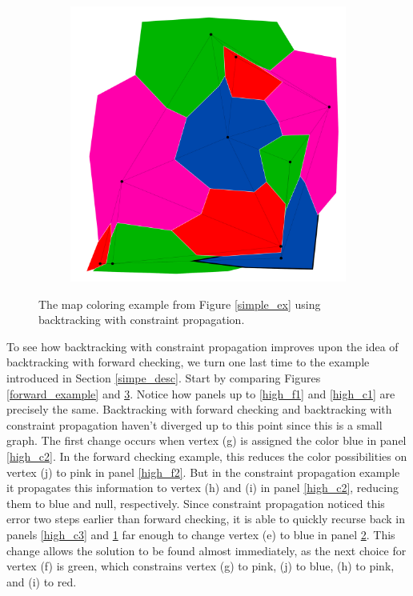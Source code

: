 \documentclass{article}
\begin{document}
\begin{figure}[h!]
\begin{subfigure}{0.18\textwidth}
				\caption{}
				\label{high_c4}
			\end{subfigure}
			\;
			\begin{subfigure}{0.18\textwidth}
				\centering
				\includegraphics[width=\textwidth]{images/sequences/mac_backtracking/bt_mac_I00018}
				\caption{}
				\label{high_c5}
			\end{subfigure}
	
			\caption{The map coloring example from Figure \ref{simple_ex} using backtracking with constraint propagation.}
			\label{mac_example}
		\end{figure}
		
		To see how backtracking with constraint propagation improves upon the idea of backtracking with forward checking, we turn one last time to the example introduced in Section \ref{simpe_desc}. Start by comparing Figures \ref{forward_example} and \ref{mac_example}. Notice how panels up to \ref{high_f1} and \ref{high_c1} are precisely the same. Backtracking with forward checking and backtracking with constraint propagation haven't diverged up to this point since this is a small graph. The first change occurs when vertex (g) is assigned the color blue in panel \ref{high_c2}. In the forward checking example, this reduces the color possibilities on vertex (j) to pink in panel \ref{high_f2}. But in the constraint propagation example it propagates this information to vertex (h) and (i) in panel \ref{high_c2}, reducing them to blue and null, respectively. Since constraint propagation noticed this error two steps earlier than forward checking, it is able to quickly recurse back in panels \ref{high_c3} and \ref{high_c4} far enough to change vertex (e) to blue in panel \ref{high_c5}. This change allows the solution to be found almost immediately, as the next choice for vertex (f) is green, which constrains vertex (g) to pink, (j) to blue, (h) to pink, and (i) to red.
		
\end{document}
